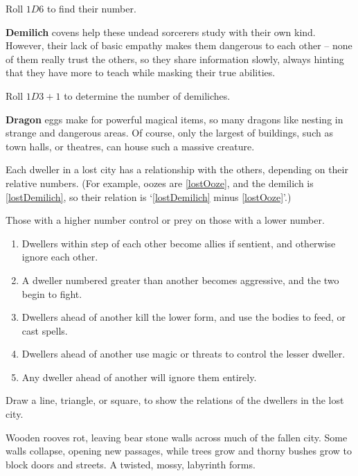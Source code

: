 \begin{multicols}{2}
\begin{dlist}
  Roll $1D6$ to find their number.
  \item\label{lostDemilich}
  \textbf{Demilich} covens help these undead sorcerers study with their own kind.
  However, their lack of basic empathy makes them dangerous to each other -- none of them really trust the others, so they share information slowly, always hinting that they have more to teach while masking their true abilities.

  Roll $1D3 + 1$ to determine the number of demiliches.
  \item
  \textbf{Dragon} eggs make for powerful magical items, so many dragons like nesting in strange and dangerous areas.
  Of course, only the largest of buildings, such as town halls, or theatres, can house such a massive creature.
\end{dlist}

Each dweller in a lost city has a relationship with the others, depending on their relative numbers.
(For example, oozes are \ref{lostOoze}, and the demilich is \ref{lostDemilich}, so their relation is `\ref{lostDemilich} minus \ref{lostOoze}'.)

Those with a higher number control or prey on those with a lower number.

\begin{enumerate}
  \item
  Dwellers within  step of each other become allies if sentient, and otherwise ignore each other.
  \item
  A dweller numbered  greater than another becomes aggressive, and the two begin to fight.
  \item
  Dwellers  ahead of another kill the lower form, and use the bodies to feed, or cast spells.
  \item
  Dwellers  ahead of another use magic or threats to control the lesser dweller.
  \item
  Any dweller  ahead of another will ignore them entirely.
\end{enumerate}

Draw a line, triangle, or square, to show the relations of the dwellers in the lost city.

\label{lostTowers}

Wooden rooves rot, leaving bear stone walls across much of the fallen city.
Some walls collapse, opening new passages, while trees grow and thorny bushes grow to block doors and streets.
A twisted, mossy, labyrinth forms.


\end{multicols}
